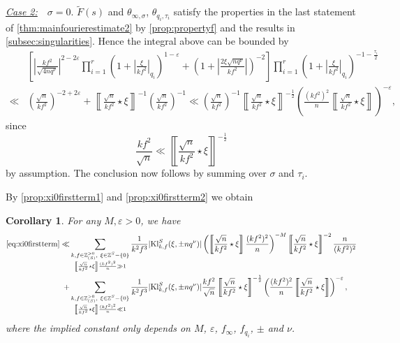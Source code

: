 \documentclass[10pt,oneside,reqno]{amsart}
\makeatletter
\newcommand\ZZ{\mathbb{Z}}
\newcommand\Kl{\mathrm{Kl}}
\newcommand\legendresymbol[2]{\genfrac{(}{)}{}{}{#1}{#2}}
\theoremstyle{THEOREM}
\newtheorem{corollary}[theorem]{Corollary}
\theoremstyle{DEFINITION}
\theoremstyle{EXERCISE}
\numberwithin{equation}{section}
\renewenvironment{proof}[1][\proofname]{\par
  \vspace{-6pt}
  \pushQED{\qed}
  \normalfont \topsep6\p@\@plus6\p@\relax
  \trivlist
  \item[\hskip\labelsep\rmfamily\bfseries
    #1\@addpunct{:}]\ignorespaces
}{
  \popQED\endtrivlist\@endpefalse
  \vspace{-6pt}
}
\makeatother
\begin{document}
\begin{proof}
\underline{\emph{Case 2:}}\ \ $\sigma=0$.
$\widetilde{F}(s)$ and $\theta_{\infty,\sigma}$, $\theta_{q_i,\tau_i}$ satisfy the properties in the last statement of \autoref{thm:mainfourierestimate2} by \autoref{prop:propertyf} and the results in \autoref{subsec:singularities}. Hence the integral above can be bounded by
\begin{align*}
&\left[\left|\frac{kf^2}{\sqrt{4nq^\nu}}\right|^{2-2\varepsilon} \prod_{i=1}^{r}\left(1+\left|\frac{\xi}{kf^2}\right|_{q_i}\right) ^{1-\varepsilon} +\left(1+\left|\frac{2\xi\sqrt{nq^\nu}}{kf^2}\right|\right)^{-2}\right] \prod_{i=1}^{r}\left(1+\left|\frac{\xi}{kf^2}\right|_{q_i}\right)^{-1-\frac{\tau_i}{2}}\\
\ll& \legendresymbol{\sqrt{n}}{kf^2}^{-2+2\varepsilon} +\left\llbracket\frac{\sqrt{n}}{kf^2}\star \xi\right\rrbracket^{-1}\left(\frac{\sqrt{n}}{kf^2}\right)^{-1}
\ll \left(\frac{\sqrt{n}}{kf^2}\right)^{-1}\left\llbracket\frac{\sqrt{n}}{kf^2}\star \xi\right\rrbracket^{-\frac12}\left(\frac{(kf^2)^2}{n}\left\llbracket\frac{\sqrt{n}}{kf^2}\star \xi\right\rrbracket\right)^{-\varepsilon},
\end{align*}
since 
\[
\frac{kf^2}{\sqrt{n}} \ll \left\llbracket\frac{\sqrt{n}}{kf^2}\star \xi\right\rrbracket^{-\frac12}
\]
by assumption.
The conclusion now follows by summing over $\sigma$ and $\tau_i$.
\end{proof}

By \autoref{prop:xi0firstterm1} and \autoref{prop:xi0firstterm2} we obtain
\begin{corollary}\label{cor:xi0firsttermfinal}
For any $M,\varepsilon>0$, we have
\begin{align*}
\eqref{eq:xi0firstterm}\ll &\sum_{\substack{k,f\in \ZZ_{(S)}^{>0},\ \xi\in \ZZ^S-\{0\} \\ \left\llbracket\frac{\sqrt{n}}{kf^2}\star \xi\right\rrbracket\frac {(kf^2)^2}{n} \gg 1}}\frac{1}{k^2f^3}|\Kl_{k,f}^S(\xi,\pm nq^\nu)|\left(\left\llbracket\frac{\sqrt{n}}{kf^2}\star \xi\right\rrbracket\frac {(kf^2)^2}{n}\right)^{-M}\left\llbracket\frac{\sqrt{n}}{kf^2}\star \xi\right\rrbracket^{-2}\frac{n}{(kf^2)^2}\\
+&\sum_{\substack{k,f\in \ZZ_{(S)}^{>0},\ \xi\in \ZZ^S-\{0\} \\ \left\llbracket\frac{\sqrt{n}}{kf^2}\star \xi\right\rrbracket\frac {(kf^2)^2}{n} \ll 1}}\frac{1}{k^2f^3}|\Kl_{k,f}^S(\xi,\pm nq^\nu)|\frac{kf^2}{\sqrt{n}}\left\llbracket\frac{\sqrt{n}}{kf^2}\star \xi\right\rrbracket^{-\frac12}\left(\frac{(kf^2)^2}{n}\left\llbracket\frac{\sqrt{n}}{kf^2}\star \xi\right\rrbracket\right)^{-\varepsilon},
\end{align*}
where the implied constant only depends on $M$, $\varepsilon$, $f_\infty$, $f_{q_i}$, $\pm$ and $\nu$.
\end{corollary}
\end{document}
